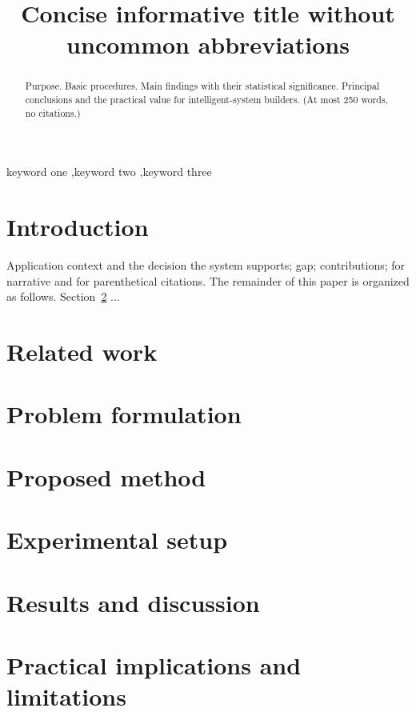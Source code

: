 \documentclass[preprint,12pt,authoryear]{elsarticle}
\begin{document}
\begin{frontmatter}
\title{Concise informative title without uncommon abbreviations}

\begin{abstract}
Purpose. Basic procedures. Main findings with their statistical significance.
Principal conclusions and the practical value for intelligent-system builders.
(At most 250 words, no citations.)
\end{abstract}

\begin{keyword}
keyword one \sep keyword two \sep keyword three   %
\end{keyword}
\end{frontmatter}

\linenumbers

\section{Introduction}\label{sec:intro}
Application context and the decision the system supports; gap; contributions;
\citet{key} for narrative and \citep{key} for parenthetical citations.
The remainder of this paper is organized as follows. Section~\ref{sec:related} ...

\section{Related work}\label{sec:related}
\section{Problem formulation}\label{sec:problem}
\section{Proposed method}\label{sec:method}
\section{Experimental setup}\label{sec:setup}
\section{Results and discussion}\label{sec:results}
\section{Practical implications and limitations}\label{sec:implications}
\end{document}
